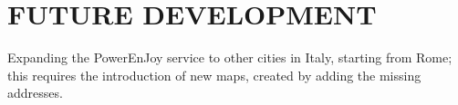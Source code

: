 \section{FUTURE DEVELOPMENT}
Expanding the PowerEnJoy service to other cities in Italy, starting from Rome; this requires the introduction of new maps, created by adding the missing addresses. 